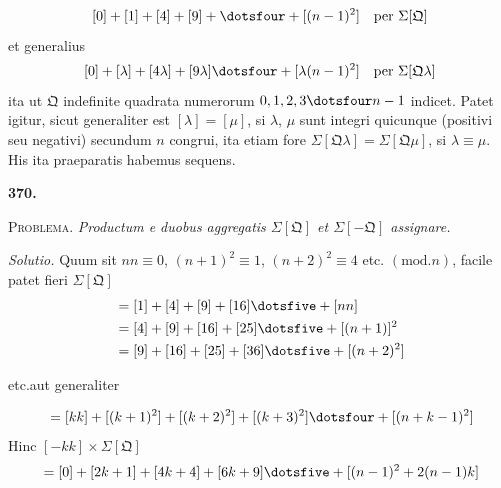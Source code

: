 \[
{}[0]+[1]+[4]+[9]+\dotsfour+[(n-1)^2]\quad\text{per }\Sigma[\mathfrak{Q}]
\]
et generalius
\[
{}[0]+[\lambda]+[4\lambda]+[9\lambda]\dotsfour+[\lambda(n-1)^2]\quad\text{per }\Sigma[\mathfrak{Q}\lambda]
\]
ita ut $\mathfrak{Q}$ indefinite quadrata numerorum $0,1,2,3\dotsfour n-1$ indicet. Patet igitur, sicut generaliter est $[\lambda]=[\mu]$, si $\lambda$, $\mu$ sunt integri quicunque (positivi seu negativi) secundum $n$ congrui, ita etiam fore $\Sigma[\mathfrak{Q}\lambda]=\Sigma[\mathfrak{Q}\mu]$, si $\lambda\equiv\mu$. His ita praeparatis habemus sequens.
\par\medskip{}\centerline{\textbf{370.}}\nobreak\smallskip
\textsc{Problema.} \textit{Productum e duobus aggregatis $\Sigma[\mathfrak{Q}]$ et $\Sigma[-\mathfrak{Q}]$ assignare.}
\par\noindent\textit{Solutio.} Quum sit $nn\equiv0$, $(n+1)^2\equiv1$, $(n+2)^2\equiv4$ etc. $(\mathrm{mod}.n)$, facile patet fieri $\Sigma[\mathfrak{Q}]$
\[
\begin{aligned}
&=[1]+[4]+[9]+[16]\dotsfive+[nn]\\
&=[4]+[9]+[16]+[25]\dotsfive+[(n+1)]^2\\
&=[9]+[16]+[25]+[36]\dotsfive+[(n+2)^2]
\end{aligned}
\]
\centerline{etc.\quad aut generaliter}
\[
{}=[kk]+[(k+1)^2]+[(k+2)^2]+[(k+3)^2]\dotsfour+[(n+k-1)^2]
\]
Hinc $[-kk]\times\Sigma[\mathfrak{Q}]$
\[
{}=[0]+[2k+1]+[4k+4]+[6k+9]\dotsfive+[(n-1)^2+2(n-1)k]
\]
